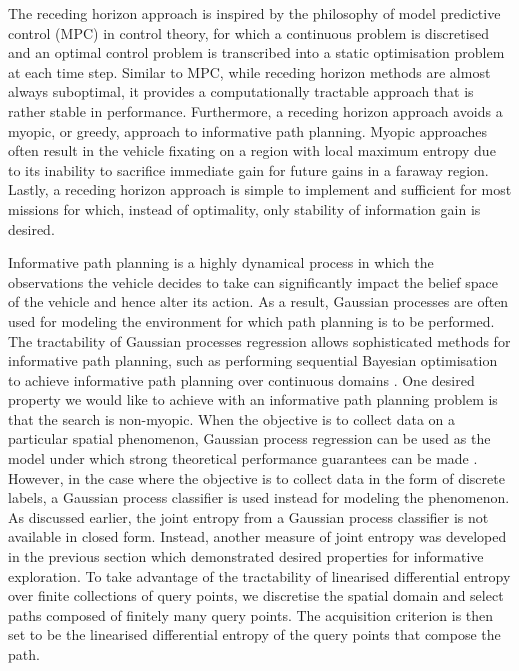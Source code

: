 \documentclass{article}
\begin{document}
		The receding horizon approach is inspired by the philosophy of model predictive control (MPC) in control theory, for which a continuous problem is discretised and an optimal control problem is transcribed into a static optimisation problem at each time step. Similar to MPC, while receding horizon methods are almost always suboptimal, it provides a computationally tractable approach that is rather stable in performance. Furthermore, a receding horizon approach avoids a myopic, or greedy, approach to informative path planning. Myopic approaches often result in the vehicle fixating on a region with local maximum entropy due to its inability to sacrifice immediate gain for future gains in a faraway region. Lastly, a receding horizon approach is simple to implement and sufficient for most missions for which, instead of optimality, only stability of information gain is desired. 
		
		Informative path planning is a highly dynamical process in which the observations the vehicle decides to take can significantly impact the belief space of the vehicle and hence alter its action. As a result, Gaussian processes are often used for modeling the environment for which path planning is to be performed. The tractability of Gaussian processes regression allows sophisticated methods for informative path planning, such as  performing sequential Bayesian optimisation to achieve informative path planning over continuous domains \cite{SequentialBayesianOptimisation}. One desired property we would like to achieve with an informative path planning problem is that the search is non-myopic. When the objective is to collect data on a particular spatial phenomenon, Gaussian process regression can be used as the model under which strong theoretical performance guarantees can be made \cite{Meliou:2007:NIP:1619645.1619742}. However, in the case where the objective is to collect data in the form of discrete labels, a Gaussian process classifier is used instead for modeling the phenomenon. As discussed earlier, the joint entropy from a Gaussian process classifier is not available in closed form. Instead, another measure of joint entropy was developed in the previous section which demonstrated desired properties for informative exploration. To take advantage of the tractability of linearised differential entropy over finite collections of query points, we discretise the spatial domain and select paths composed of finitely many query points. The acquisition criterion is then set to be the linearised differential entropy of the query points that compose the path.
\end{document}
